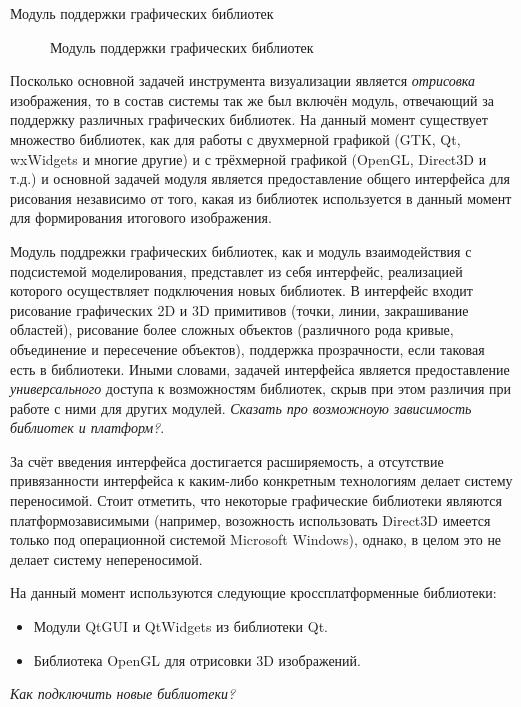 \documentclass[a4paper,12pt]{extarticle}
\begin{document}
\begin{subsection}{Модуль поддержки графических библиотек}
    \begin{figure}[h]
        \caption{Модуль поддержки графических библиотек}
        \label{ris:architecture-graphics}
    \end{figure}
    
    Посколько основной задачей инструмента визуализации является \textit{отрисовка} изображения, то в состав системы так же был включён модуль, отвечающий за поддержку различных графических библиотек. На данный момент существует множество библиотек, как для работы с двухмерной графикой (GTK, Qt, wxWidgets и многие другие) и с трёхмерной графикой (OpenGL, Direct3D и т.д.) и основной задачей модуля является предоставление общего интерфейса для рисования независимо от того, какая из библиотек используется в данный момент для формирования итогового изображения.

    Модуль поддрежки графических библиотек, как и модуль взаимодействия с подсистемой моделирования, представлет из себя интерфейс, реализацией которого осуществляет подключения новых библиотек. В интерфейс входит рисование графических 2D и 3D примитивов (точки, линии, закрашивание областей), рисование более сложных объектов (различного рода кривые, объединение и пересечение объектов), поддержка прозрачности, если таковая есть в библиотеки. Иными словами, задачей интерфейса является предоставление \textit{универсального} доступа к возможностям библиотек, скрыв при этом различия при работе с ними для других модулей. \textit{Сказать про возможноую зависимость библиотек и платформ?}.

    За счёт введения интерфейса достигается расширяемость, а отсутствие привязанности интерфейса к каким-либо конкретным технологиям делает систему переносимой. Стоит отметить, что некоторые графические библиотеки являются платформозависимыми (например, возожность использовать Direct3D имеется только под операционной системой Microsoft Windows), однако, в целом это не делает систему непереносимой.

    На данный момент используются следующие кроссплатформенные библиотеки:
    \begin{itemize}
        \item Модули QtGUI и QtWidgets из библиотеки Qt.
        \item Библиотека OpenGL для отрисовки 3D изображений.
    \end{itemize}
    \textit{Как подключить новые библиотеки?}
\end{subsection}
\end{document}
